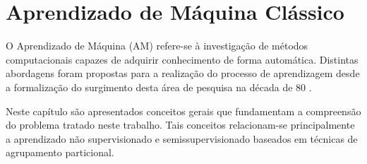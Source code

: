 \chapter{Aprendizado de Máquina Clássico} \label{chAM}

O Aprendizado de Máquina (AM) refere-se à investigação de métodos computacionais capazes de adquirir conhecimento de forma automática. Distintas abordagens foram propostas para a realização do processo de aprendizagem desde a formalização do surgimento desta área de pesquisa na década de 80 \cite{Langley2011}.

Neste capítulo são apresentados conceitos gerais que fundamentam a compreensão do problema tratado neste trabalho. Tais conceitos relacionam-se principalmente a aprendizado não supervisionado e semissupervisionado baseados em técnicas de agrupamento particional.





